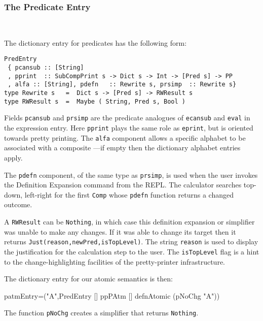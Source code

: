 \subsubsection{The Predicate Entry}~

The dictionary entry for predicates has the following form:
\begin{verbatim}
PredEntry
 { pcansub :: [String]
 , pprint  :: SubCompPrint s -> Dict s -> Int -> [Pred s] -> PP
 , alfa :: [String], pdefn   :: Rewrite s, prsimp  :: Rewrite s}
type Rewrite s   =  Dict s -> [Pred s] -> RWResult s
type RWResult s  =  Maybe ( String, Pred s, Bool )
\end{verbatim}
Fields \texttt{pcansub} and \texttt{prsimp} are the predicate analogues
of \texttt{ecansub} and \texttt{eval} in the expression entry.
Here \texttt{pprint} plays the same role as \texttt{eprint},
but is oriented towards pretty printing.
The \texttt{alfa} component allows a specific alphabet to
be associated with a composite
---if empty then the dictionary alphabet entries apply.

The \texttt{pdefn} component, of the same type as \texttt{prsimp},
is used when the user invokes the Definition Expansion
command from the REPL.
The calculator searches top-down, left-right
    for the first \texttt{Comp} whose \texttt{pdefn} function
    returns a changed outcome.

A \texttt{RWResult} can be \texttt{Nothing},
in which case this definition expansion or simplifier
was unable to make any changes.
If it was able to change its target then it returns
\texttt{Just(reason,newPred,isTopLevel)}.
The string \texttt{reason} is used to display the justification for the
calculation step to the user.
The \texttt{isTopLevel} flag is a hint to the change-highlighting facilities
of the pretty-printer infrastructure.


The dictionary entry for our atomic semantics is then:
\begin{code}
patmEntry=("A",PredEntry [] ppPAtm [] defnAtomic (pNoChg "A"))
\end{code}
The function \texttt{pNoChg} creates a simplifier that returns \texttt{Nothing}.
